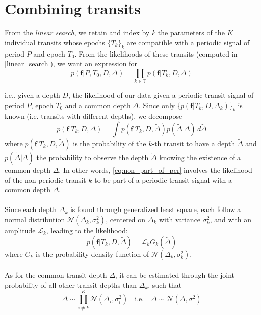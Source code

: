 \documentclass{aastex631}
\begin{document}
\newpage
\section{Combining transits}\label{combining_transits}

\newcommand{\sumTk}{i\neq k}
From the \textit{linear search}, we retain and index by $k$ the parameters of the $K$ individual transits whose epochs $\{T_k\}_k$ are compatible with a periodic signal of period $P$ and epoch $T_0$. From the likelihoods of these transits (computed in \autoref{linear_search}), we want an expression for
\begin{equation}\label{eq:goal2}
    p(\bm{f} \vert P, T_0 ,D, \Delta) = \prod_{k\in\mathbb{T}} p(\bm{f} \vert T_k, D, \Delta)
\end{equation}

i.e., given a depth $D$, the likelihood of our data given a periodic transit signal of period $P$, epoch $T_0$ and a common depth $\Delta$. Since only $\{p(\bm{f} \vert T_k, D, \Delta_k)\}_{k}$ is known (i.e. transits with different depths), we decompose
\begin{equation}\label{eq:non_part_of_per}
    p(\bm{f} \vert T_k, D, \Delta) = \int p(\bm{f} \vert T_k, D, \tilde\Delta)p(\tilde\Delta | \Delta)\, d\tilde\Delta
\end{equation}
where $p(\bm{f} \vert T_k, D, \tilde\Delta)$ is the probability of the $k$-th transit to have a depth $\tilde\Delta$ and $p(\tilde\Delta | \Delta)$ the probability to observe the depth $\tilde\Delta$ knowing the existence of a common depth $\Delta$. In other words, \autoref{eq:non_part_of_per} involves the likelihood of the non-periodic transit $k$ to be part of a periodic transit signal with a common depth $\Delta$.
\\\\
Since each depth $\Delta_k$ is found through generalized least square, each follow a normal distribution $\mathcal{N}(\Delta_k, \sigma_k^2)$, centered on $\Delta_k$ with variance $\sigma_k^2$, and with an amplitude $\mathcal{L}_k$, leading to the likelihood:
$$p(\bm{f} \vert T_k, D, \tilde\Delta) = \mathcal{L}_k G_k(\tilde\Delta)$$
where $G_k$ is the probability density function of $\mathcal{N}(\Delta_k, \sigma_k^2)$. 
\\\\
As for the common transit depth $\Delta$, it can be estimated through the joint probability of all other transit depths than $\Delta_k$, such that
$$\Delta \sim \prod_{\sumTk}^K \mathcal{N}(\Delta_i, \sigma_i^2) \quad\text{i.e.}\quad \Delta \sim \mathcal{N}(\Delta, \sigma^2) $$
\end{document}
